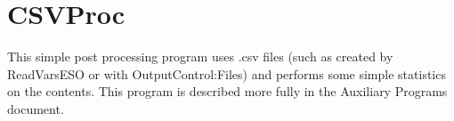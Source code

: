 \section{CSVProc}\label{csvproc}

This simple post processing program uses .csv files (such as created by ReadVarsESO or with OutputControl:Files) and performs some simple statistics on the contents. This program is described more fully in the Auxiliary Programs document.
